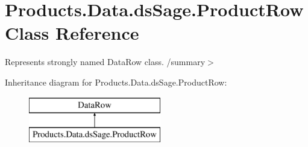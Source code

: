 \hypertarget{class_products_1_1_data_1_1ds_sage_1_1_product_row}{}\section{Products.\+Data.\+ds\+Sage.\+Product\+Row Class Reference}
\label{class_products_1_1_data_1_1ds_sage_1_1_product_row}


Represents strongly named Data\+Row class. /summary$>$  


Inheritance diagram for Products.\+Data.\+ds\+Sage.\+Product\+Row\+:\begin{figure}[H]
\begin{center}
\leavevmode
\includegraphics[height=2.000000cm]{class_products_1_1_data_1_1ds_sage_1_1_product_row}
\end{center}
\end{figure}
